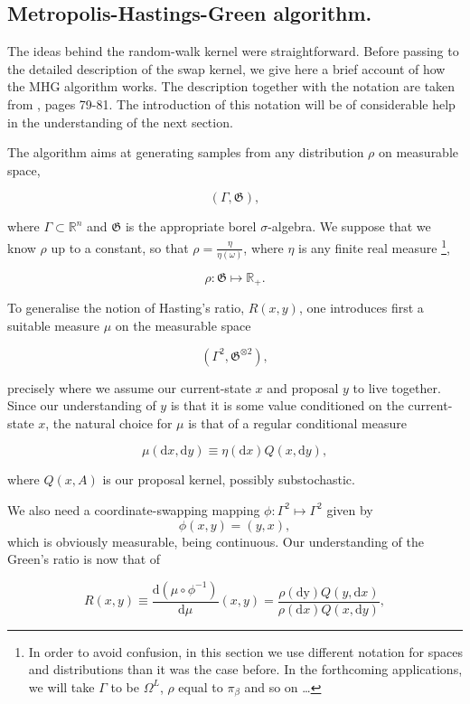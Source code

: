 	\subsection*{Metropolis-Hastings-Green algorithm.}

The ideas behind the random-walk kernel were straightforward. Before passing to the detailed description of the swap kernel, we give here a brief account of how the MHG algorithm works. The description together with the notation are taken from \cite{CharlesJ.Geyer}, pages 79-81. The introduction of this notation will be of considerable help in the understanding of the next section. 

The algorithm aims at generating samples from any distribution $\rho$ on measurable space,

	$$(\Gamma, \mathfrak{G}),$$

where $\Gamma \subset \mathbb{R}^n$ and $\mathfrak{G}$ is the appropriate borel $\sigma$-algebra. We suppose that we know $\rho$ up to a constant, so that $\rho = \frac{\eta}{\eta(\omega)}$, where $\eta$ is any finite real measure \footnote{In order to avoid confusion, in this section we use different notation for spaces and distributions than it was the case before. In the forthcoming applications, we will take $\Gamma$ to be $\Omega^L$, $\rho$ equal to $\pi_\beta$ and so on \dots}, 

	$$\rho: \mathfrak{G} \mapsto \mathbb{R}_{+}.$$  

To generalise the notion of Hasting's ratio, $R(x,y)$, one introduces first a suitable measure $\mu$ on the measurable space 

	$$(\Gamma^2, \mathfrak{G}^{\otimes 2}),$$ 

precisely where we assume our current-state $x$ and proposal $y$ to live together. Since our understanding of $y$ is that it is some value conditioned on the current-state $x$, the natural choice for $\mu$ is that of a regular conditional measure

	$$\mu(\mathrm{d }x, \mathrm{d }y)   \equiv \eta (\mathrm{d} x) Q(x, \mathrm{d } y),$$

where $Q(x,A)$ is our proposal kernel, possibly substochastic.
 
 
We also need a coordinate-swapping mapping $\phi: \Gamma^2 \mapsto \Gamma^2$ given by $$\phi(x,y) = (y,x),$$ which is obviously measurable, being continuous. Our understanding of the Green's ratio is now that of

	$$R(x,y) \equiv	\frac{\mathrm{d }(\mu \circ \phi^{-1})}{\mathrm{d }\mu} (x,y) = \frac{\rho(\mathrm{d y} )Q(y, \mathrm{d }x)}{\rho(\mathrm{d }x) Q(x, \mathrm{d }y)},$$

